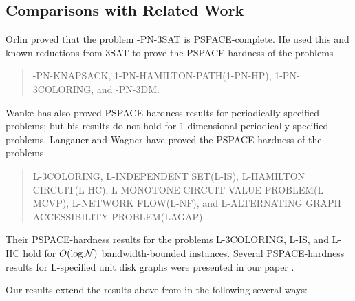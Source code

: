 \subsection{Comparisons with Related Work}\label{sec:comp}
Orlin \cite{Or82a} proved that the problem {-PN-3SAT} is 
{\sf PSPACE-}complete. He used this and known reductions from {\sf 3SAT} 
to prove the {\sf PSPACE-}hardness of the problems 
\begin{quote}
{-PN-KNAPSACK, 1-PN-HAMILTON-PATH(1-PN-HP), 1-PN-3COLORING,} and 
{-PN-3DM}.
\end{quote}
Wanke \cite{Wa93} has also proved {\sf PSPACE-}hardness results for periodically-specified problems; but his results do not hold for 1-dimensional 
periodically-specified problems. Langauer and Wagner \cite{LW92} have proved
the {\sf PSPACE}-hardness of the problems 
\begin{quote}
{\sf L-3COLORING, L-INDEPENDENT SET(L-IS), L-HAMILTON CIRCUIT(L-HC), L-MONOTONE CIRCUIT  VALUE PROBLEM(L-MCVP), L-NETWORK FLOW(L-NF),} and {\sf L-ALTERNATING GRAPH ACCESSIBILITY PROBLEM(LAGAP).}
\end{quote}
Their {\sf PSPACE-}hardness results for the problems {\sf L-3COLORING, L-IS,}
and {\sf L-HC} hold for $O(\log {\cal N})$ bandwidth-bounded instances. Several
{\sf PSPACE-}hardness results for {\sf L-}specified unit disk graphs were 
presented in our paper \cite{MR+93}. 

Our results extend the results above from \cite{Or82a,LW92}  
in the following several ways:

